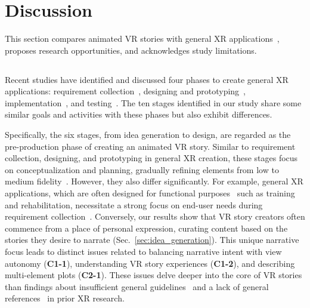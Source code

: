 \section{Discussion}

This section compares animated VR stories with general XR applications~\cite{ashtari2020creating, krauss2022elements, liu2023challenges, krauss2021current}, proposes research opportunities, and acknowledges study limitations.

\subsection{}

Recent studies have identified and discussed four phases to create general XR applications: requirement collection~\cite{borsting2022software}, designing and prototyping~\cite{ashtari2020creating, krauss2022elements}, implementation~\cite{ashtari2020creating, krauss2021current}, and testing~\cite{ashtari2020creating, liu2023challenges}. The ten stages identified in our study share some similar goals and activities with these phases but also exhibit differences.



Specifically, the six stages, from idea generation to design, are regarded as the pre-production phase of creating an animated VR story. Similar to requirement collection, designing, and prototyping in general XR creation, these stages focus on conceptualization and planning, gradually refining elements from low to medium fidelity~\cite{ashtari2020creating, krauss2022elements}. 
However, they also differ significantly.
For example, general XR applications, which are often designed for functional purposes~\cite{ashtari2020creating} such as training and rehabilitation, necessitate a strong focus on end-user needs during requirement collection~\cite{borsting2022software}. Conversely, our results show that VR story creators often commence from a place of personal expression, curating content based on the stories they desire to narrate (Sec.~\ref{sec:idea_generation}). 
This unique narrative focus leads to distinct issues related to balancing narrative intent with view autonomy (\textbf{C1-1}), understanding VR story experiences (\textbf{C1-2}), and describing multi-element plots (\textbf{C2-1}). 
These issues delve deeper into the core of VR stories than findings about insufficient general guidelines~\cite{ashtari2020creating} and a lack of general references~\cite{ashtari2020creating, krauss2021current} in prior XR research.

